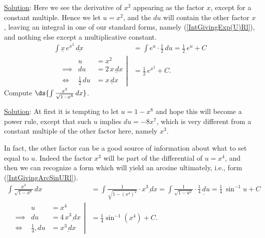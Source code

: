 \underline{Solution}:  Here we see the derivative of $x^2$ appearing
as the factor $x$, except for a constant multiple.  Hence we let $u=x^2$,
and the $du$ will contain the other factor $x$, leaving
an integral in one of our standard forms, namely (\ref{IntGivingExp(U)Rl}),
and nothing else except
a multiplicative constant.
\begin{align*}\int \underline{x}\, e^{x^2}\,\underline{dx}
 &=\int e^u\cdot\frac12\,du
  =\frac12\,e^u+C\\
\left.\begin{alignedat}{2}
&&u&=x^2\\
&\implies&du&=2\,\underline{x\,dx}\\
&\iff&\frac12\,du&=\underline{x\,dx}
\end{alignedat}\right|
&=\frac12\,e^{x^2}+C.
\end{align*}
\label{IntXE^x^2Example}\eex
%
\bex Compute $\ds{\int\frac{x^3}{\sqrt{1-x^8}}\,dx}$.

\underline{Solution}: At first it is tempting to let $u=1-x^8$
and hope this will become a power rule,
except that such $u$ implies $du=-8x^7$,
 which is very different from a constant
multiple of the other factor here, namely $x^3$.  

In fact, the other factor can be a good source of information
about what to set equal to $u$.  Indeed the factor $x^3$ will
be part of the differential of $u=x^4$, and then we can recognize
a form which will yield an arcsine ultimately, i.e., form
(\ref{IntGivingArcSinURl}).
\begin{align*}
\int\frac{x^3}{\sqrt{1-x^8}}\,dx
&=\int\frac{1}{\sqrt{1-\left(x^4\right)^2}}\cdot\underline{x^3\,dx}
=\int\frac1{\sqrt{1-u^2}}\cdot\underline{\frac14\,du}
=\frac14\,\sin^{-1}u+C\\
\left.\begin{alignedat}{2}
&&u&=x^4\\
&\implies&du&=4\,\underline{x^3\,dx}\\
&\iff&\frac14,du&=\underline{x^3\,dx}
\end{alignedat}\right|&=\frac14\sin^{-1}\left(x^4\right)
                      +C.
\end{align*}
\eex

